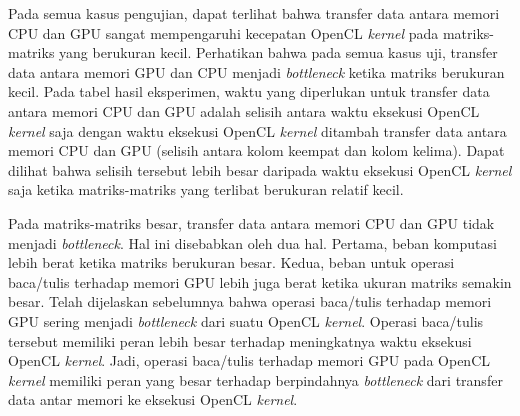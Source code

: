 Pada semua kasus pengujian, dapat terlihat bahwa transfer data antara memori CPU dan GPU sangat mempengaruhi kecepatan OpenCL \textit{kernel} pada matriks-matriks yang berukuran kecil. Perhatikan bahwa pada semua kasus uji, transfer data antara memori GPU dan CPU menjadi \textit{bottleneck} ketika matriks berukuran kecil. Pada tabel hasil eksperimen, waktu yang diperlukan untuk transfer data antara memori CPU dan GPU adalah selisih antara waktu eksekusi OpenCL \textit{kernel} saja dengan waktu eksekusi OpenCL \textit{kernel} ditambah transfer data antara memori CPU dan GPU (selisih antara kolom keempat dan kolom kelima). Dapat dilihat bahwa selisih tersebut lebih besar daripada waktu eksekusi OpenCL \textit{kernel} saja ketika matriks-matriks yang terlibat berukuran relatif kecil. 

Pada matriks-matriks besar, transfer data antara memori CPU dan GPU tidak menjadi \textit{bottleneck}. Hal ini disebabkan oleh dua hal. Pertama, beban komputasi lebih berat ketika matriks berukuran besar. Kedua, beban untuk operasi baca/tulis terhadap memori GPU lebih juga berat ketika ukuran matriks semakin besar. Telah dijelaskan sebelumnya bahwa operasi baca/tulis terhadap memori GPU sering menjadi \textit{bottleneck} dari suatu OpenCL \textit{kernel}. Operasi baca/tulis tersebut memiliki peran lebih besar terhadap meningkatnya waktu eksekusi OpenCL \textit{kernel}. Jadi, operasi baca/tulis terhadap memori GPU pada OpenCL \textit{kernel} memiliki peran yang besar terhadap berpindahnya \textit{bottleneck} dari transfer data antar memori ke eksekusi OpenCL \textit{kernel}.